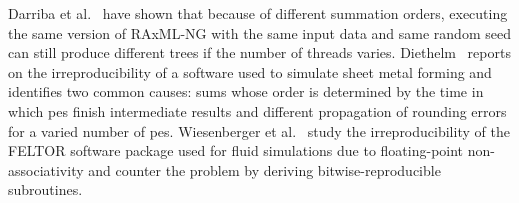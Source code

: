 Darriba et al.~\cite{darriba_state_2018} have shown that because of different summation orders, executing the same version of RAxML-NG with the same input data and same random seed can still produce different trees if the number of threads varies.
Diethelm~\cite{diethelm_limits_2012} reports on the irreproducibility of a software used to simulate sheet metal forming and identifies two common causes: sums whose order is determined by the time in which \glspl{pe} finish intermediate results and different propagation of rounding errors for a varied number of \glspl{pe}.
Wiesenberger et al.~\cite{wiesenberger_reproducibility_2019} study the irreproducibility of the \textsc{FELTOR} software package used for fluid simulations due to floating-point non-associativity and counter the problem by deriving bitwise-reproducible subroutines.